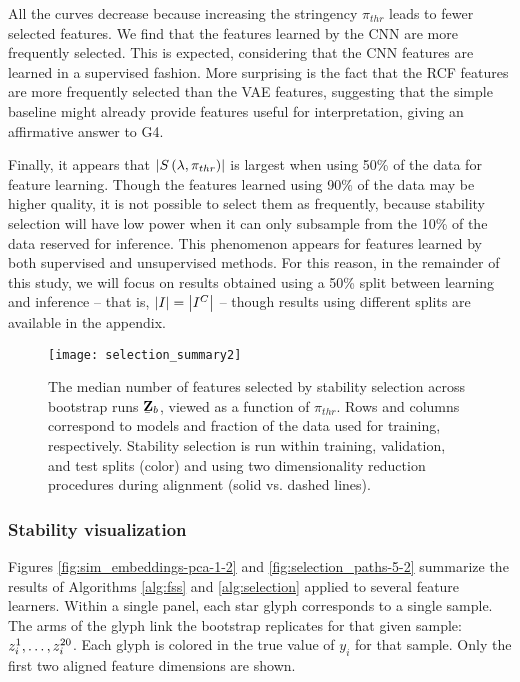 All the curves decrease because increasing the stringency $\pi_{thr}$ leads to
fewer selected features. We find that the features learned by the CNN are more
frequently selected. This is expected, considering that the CNN features are
learned in a supervised fashion. More surprising is the fact that the RCF
features are more frequently selected than the VAE features, suggesting that the
simple baseline might already provide features useful for interpretation, giving
an affirmative answer to G4.

Finally, it appears that $\left|S\left(\lambda, \pi_{thr}\right)\right|$ is largest
when using 50\% of the data for feature learning. Though the features learned
using 90\% of the data may be higher quality, it is not possible to select them
as frequently, because stability selection will have low power when it can only
subsample from the 10\% of the data reserved for inference. This phenomenon
appears for features learned by both supervised and unsupervised methods. For
this reason, in the remainder of this study, we will focus on results obtained
using a 50\% split between learning and inference -- that is, $\left|I\right| =
\left|I^{C}\right|$ -- though results using different splits are available in the
appendix.

\begin{figure}
  \centering
  \texttt{[image: selection\_summary2]}
  \caption{The median number of features selected by stability selection across
    bootstrap runs $\protect\underaccent{\bar}{\mathbf{Z}}_{b}$, viewed as a
    function of $\pi_{thr}$. Rows and columns correspond to models and fraction
    of the data used for training, respectively. Stability selection is run
    within training, validation, and test splits (color) and using two
    dimensionality reduction procedures during alignment (solid vs. dashed
    lines).}
  \label{fig:selection_summary}
\end{figure}

\subsubsection{Stability visualization}

Figures \ref{fig:sim_embeddings-pca-1-2} and \ref{fig:selection_paths-5-2}
summarize the results of Algorithms \ref{alg:fss} and \ref{alg:selection}
applied to several feature learners. Within a single panel, each star glyph
corresponds to a single sample. The arms of the glyph link the bootstrap
replicates for that given sample: $\protect z_{i}^{1}, \dots, z_{i}^{20}$. Each
glyph is colored in the true value of $y_{i}$ for that sample. Only the first
two aligned feature dimensions are shown.

